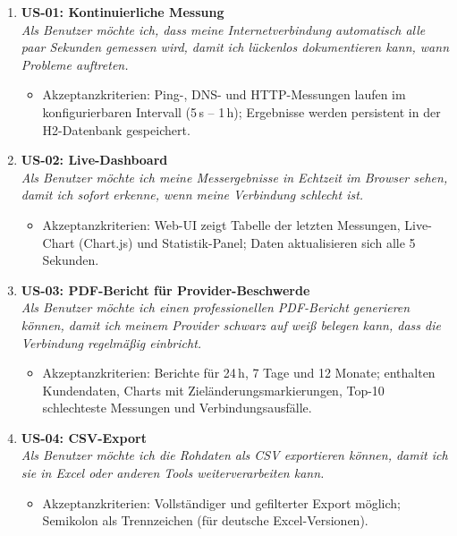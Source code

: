 \begin{enumerate}
  \item \textbf{US-01: Kontinuierliche Messung}\\
    \textit{Als Benutzer möchte ich, dass meine Internetverbindung automatisch alle paar
    Sekunden gemessen wird, damit ich lückenlos dokumentieren kann, wann Probleme auftreten.}
    \begin{itemize}
      \item Akzeptanzkriterien: Ping-, DNS- und HTTP-Messungen laufen im konfigurierbaren
        Intervall (5\,s -- 1\,h); Ergebnisse werden persistent in der H2-Datenbank gespeichert.
    \end{itemize}

  \item \textbf{US-02: Live-Dashboard}\\
    \textit{Als Benutzer möchte ich meine Messergebnisse in Echtzeit im Browser sehen, damit
    ich sofort erkenne, wenn meine Verbindung schlecht ist.}
    \begin{itemize}
      \item Akzeptanzkriterien: Web-UI zeigt Tabelle der letzten Messungen, Live-Chart
        (Chart.js) und Statistik-Panel; Daten aktualisieren sich alle 5 Sekunden.
    \end{itemize}

  \item \textbf{US-03: PDF-Bericht für Provider-Beschwerde}\\
    \textit{Als Benutzer möchte ich einen professionellen PDF-Bericht generieren können, damit
    ich meinem Provider schwarz auf weiß belegen kann, dass die Verbindung regelmäßig
    einbricht.}
    \begin{itemize}
      \item Akzeptanzkriterien: Berichte für 24\,h, 7 Tage und 12 Monate; enthalten
        Kundendaten, Charts mit Zieländerungsmarkierungen, Top-10 schlechteste Messungen
        und Verbindungsausfälle.
    \end{itemize}

  \item \textbf{US-04: CSV-Export}\\
    \textit{Als Benutzer möchte ich die Rohdaten als CSV exportieren können, damit ich sie in
    Excel oder anderen Tools weiterverarbeiten kann.}
    \begin{itemize}
      \item Akzeptanzkriterien: Vollständiger und gefilterter Export möglich; Semikolon
        als Trennzeichen (für deutsche Excel-Versionen).
    \end{itemize}


\end{enumerate}
